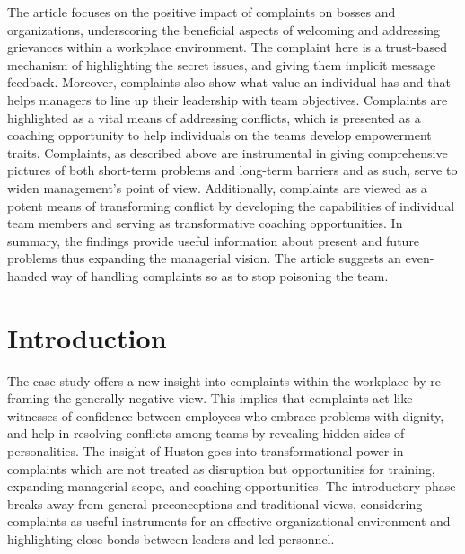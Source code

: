 \documentclass[a4paper,12pt]{report}
\begin{document}
The article focuses on the positive impact of complaints on bosses and organizations, underscoring the beneficial aspects of welcoming and addressing grievances within a workplace environment. The complaint here is a trust-based mechanism of highlighting the secret issues, and giving them implicit message feedback. Moreover, complaints also show what value an individual has and that helps managers to line up their leadership with team objectives. Complaints are highlighted as a vital means of addressing conflicts, which is presented as a coaching opportunity to help individuals on the teams develop empowerment traits. Complaints, as described above are instrumental in giving comprehensive pictures of both short-term problems and long-term barriers and as such, serve to widen management's point of view. Additionally, complaints are viewed as a potent means of transforming conflict by developing the capabilities of individual team members and serving as transformative coaching opportunities. In summary, the findings provide useful information about present and future problems thus expanding the managerial vision. The article suggests an even-handed way of handling complaints so as to stop poisoning the team.

\chapter{Introduction}
The case study offers a new insight into complaints within the workplace by re-framing the generally negative view. This implies that complaints act like witnesses of confidence between employees who embrace problems with dignity, and help in resolving conflicts among teams by revealing hidden sides of personalities. The insight of Huston goes into transformational power in complaints which are not treated as disruption but opportunities for training, expanding managerial scope, and coaching opportunities. The introductory phase breaks away from general preconceptions and traditional views, considering complaints as useful instruments for an effective organizational environment and highlighting close bonds between leaders and led personnel.
\end{document}
